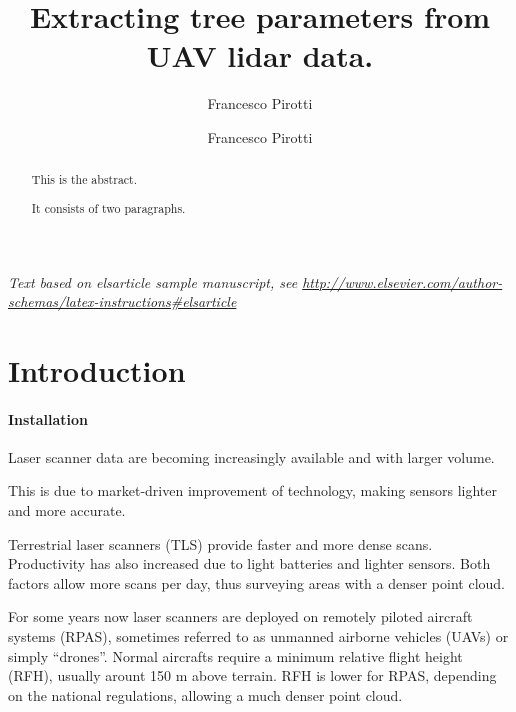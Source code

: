 \documentclass[]{elsarticle} %
\begin{document}
\begin{frontmatter}

  \title{Extracting tree parameters from UAV lidar data.}
    \author[CIRGEO Interdepartmental Research Center of Research of Geomatics]{Francesco Pirotti}
    \author[TESAF Department]{Francesco Pirotti}
      \address[Some Institute of Technology]{Department, Street, City, State, Zip}
    \address[Another University]{Department, Street, City, State, Zip}
  
  \begin{abstract}
  This is the abstract.
  
  It consists of two paragraphs.
  \end{abstract}
  
 \end{frontmatter}

\emph{Text based on elsarticle sample manuscript, see
\url{http://www.elsevier.com/author-schemas/latex-instructions\#elsarticle}}

\hypertarget{introduction}{%
\section{Introduction}\label{introduction}}

\hypertarget{installation}{%
\paragraph{Installation}\label{installation}}

Laser scanner data are becoming increasingly available and with larger
volume.

This is due to market-driven improvement of technology, making sensors
lighter and more accurate.

Terrestrial laser scanners (TLS) provide faster and more dense scans.
Productivity has also increased due to light batteries and lighter
sensors. Both factors allow more scans per day, thus surveying areas
with a denser point cloud.

For some years now laser scanners are deployed on remotely piloted
aircraft systems (RPAS), sometimes referred to as unmanned airborne
vehicles (UAVs) or simply ``drones''. Normal aircrafts require a minimum
relative flight height (RFH), usually arount 150 m above terrain. RFH is
lower for RPAS, depending on the national regulations, allowing a much
denser point cloud.
\end{document}
